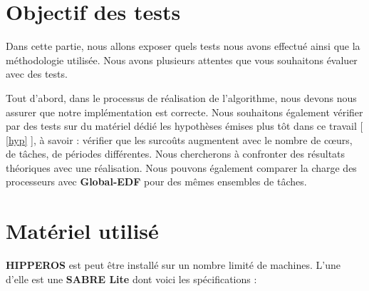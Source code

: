 \section{Objectif des tests}

	Dans cette partie, nous allons exposer quels tests nous avons effectué ainsi que 
	la méthodologie utilisée.
	Nous avons plusieurs attentes que vous souhaitons évaluer avec des tests. \newline
	 
	Tout d'abord, dans le processus de réalisation de l'algorithme, nous devons nous assurer 
	que notre implémentation est correcte. Nous souhaitons également vérifier par des tests 
	sur du matériel dédié les hypothèses émises plus tôt dans ce travail [ \hyperref[hyp]{\ref{hyp}} ], 
	à savoir : vérifier que les surcoûts augmentent avec le nombre de cœurs, de tâches, 
	de périodes différentes. 
	Nous chercherons à confronter des résultats théoriques avec une réalisation.
	Nous pouvons également comparer la charge des processeurs avec \textbf{Global-EDF} pour des mêmes ensembles de tâches.

	

\section{Matériel utilisé}
	\textbf{HIPPEROS} est peut être installé sur un nombre limité de machines. 
	L'une d'elle est une \textbf{SABRE Lite} dont voici les spécifications :
	
